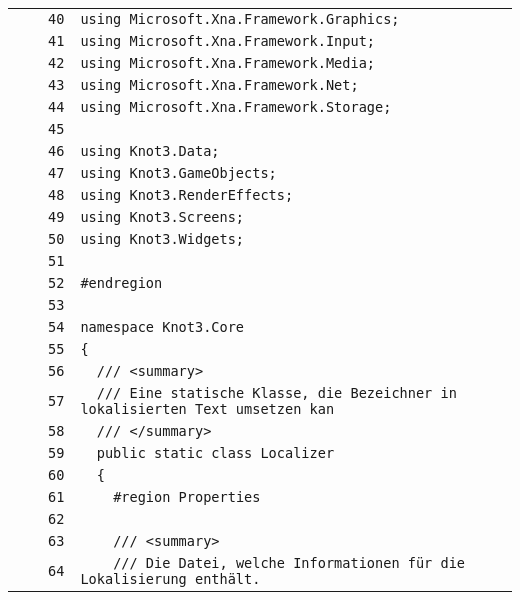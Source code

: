 \documentclass[a4paper,10pt]{article}
\begin{document}
\begin{longtable}[l]{lrrl}
\cellcolor{gray} &  & \verb~40~ & \verb~using Microsoft.Xna.Framework.Graphics;~\\
\cellcolor{gray} &  & \verb~41~ & \verb~using Microsoft.Xna.Framework.Input;~\\
\cellcolor{gray} &  & \verb~42~ & \verb~using Microsoft.Xna.Framework.Media;~\\
\cellcolor{gray} &  & \verb~43~ & \verb~using Microsoft.Xna.Framework.Net;~\\
\cellcolor{gray} &  & \verb~44~ & \verb~using Microsoft.Xna.Framework.Storage;~\\
\cellcolor{gray} &  & \verb~45~ & \verb~~\\
\cellcolor{gray} &  & \verb~46~ & \verb~using Knot3.Data;~\\
\cellcolor{gray} &  & \verb~47~ & \verb~using Knot3.GameObjects;~\\
\cellcolor{gray} &  & \verb~48~ & \verb~using Knot3.RenderEffects;~\\
\cellcolor{gray} &  & \verb~49~ & \verb~using Knot3.Screens;~\\
\cellcolor{gray} &  & \verb~50~ & \verb~using Knot3.Widgets;~\\
\cellcolor{gray} &  & \verb~51~ & \verb~~\\
\cellcolor{gray} &  & \verb~52~ & \verb~#endregion~\\
\cellcolor{gray} &  & \verb~53~ & \verb~~\\
\cellcolor{gray} &  & \verb~54~ & \verb~namespace Knot3.Core~\\
\cellcolor{gray} &  & \verb~55~ & \verb~{~\\
\cellcolor{gray} &  & \verb~56~ & \verb~  /// <summary>~\\
\cellcolor{gray} &  & \verb~57~ & \verb~  /// Eine statische Klasse, die Bezeichner in lokalisierten Text umsetzen kan~\\
\cellcolor{gray} &  & \verb~58~ & \verb~  /// </summary>~\\
\cellcolor{gray} &  & \verb~59~ & \verb~  public static class Localizer~\\
\cellcolor{gray} &  & \verb~60~ & \verb~  {~\\
\cellcolor{gray} &  & \verb~61~ & \verb~    #region Properties~\\
\cellcolor{gray} &  & \verb~62~ & \verb~~\\
\cellcolor{gray} &  & \verb~63~ & \verb~    /// <summary>~\\
\cellcolor{gray} &  & \verb~64~ & \verb~    /// Die Datei, welche Informationen für die Lokalisierung enthält.~\\

\end{longtable}
\end{document}
